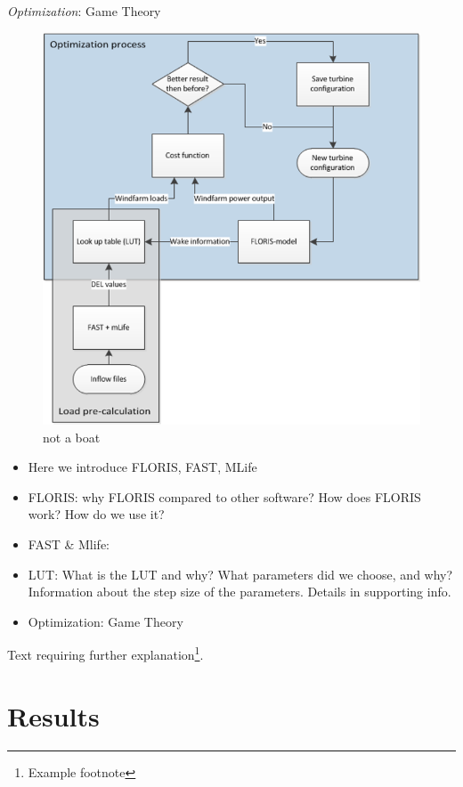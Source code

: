 \documentclass[twoside,twocolumn]{article}
\begin{document}
\textit{Optimization}: Game Theory
\begin{figure}
  \includegraphics[width=\linewidth]{OptimizationProcess.png}
  \caption{not a boat}
  \label{fig:optim}
\end{figure}
	\begin{itemize}
		\item Here we introduce FLORIS, FAST, MLife
		\item FLORIS: why FLORIS compared to other software? How does FLORIS work? How do we use it?
		\item FAST \& Mlife:
		\item LUT: What is the LUT and why? What parameters did we choose, and why? Information about the step size of the parameters. Details in supporting info.
		\item Optimization: Game Theory
	\end{itemize}
	\blindtext %
	





	Text requiring further explanation\footnote{Example footnote}.
	
	
	\section{Results}
	
\end{document}
